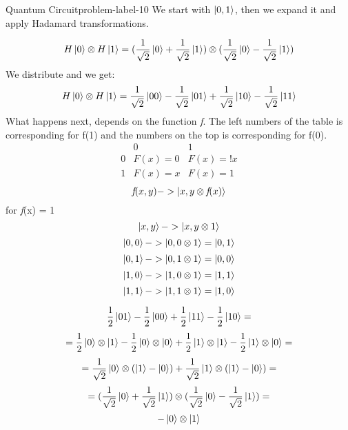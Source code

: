 \begin{problem}{Quantum Circuit}{problem-label-10}
We start with $\ket{0,1}$, then we expand it and apply Hadamard transformations.

\[
H\ket{0} \otimes H\ket{1} = (\frac{1}{\sqrt{2}}\ket{0} + \frac{1}{\sqrt{2}}\ket{1}) \otimes (\frac{1}{\sqrt{2}}\ket{0}-\frac{1}{\sqrt{2}}\ket{1})
\]
We distribute and we get:
\[
H\ket{0} \otimes H\ket{1} = \frac{1}{\sqrt{2}}\ket{00}- \frac{1}{\sqrt{2}}\ket{01} + \frac{1}{\sqrt{2}}\ket{10}-\frac{1}{\sqrt{2}}\ket{11}
\]
What happens next, depends on the function \textit{f}. The left numbers of the table is corresponding for f(1) and the numbers on the top is corresponding for f(0).
\[
\begin{array}{c|c|c}
	 & 0 & 1 \\ \hline
	0 & F(x) = 0 & F(x) = !x \\
	1 & F(x) = x & F(x) = 1
\end{array}
\]
\[
\textit{f}(x,y) -> \ket{x,y\otimes \textit{f}(x)}
\]
for \textit{f}(x) = 1
\[
\ket{x,y} -> \ket{x,y\otimes1} 
\]
\[
\ket{0,0} -> \ket{0,0\otimes1} = \ket{0,1}
\]
\[
\ket{0,1} -> \ket{0,1\otimes1} = \ket{0,0}
\]
\[
\ket{1,0} -> \ket{1,0\otimes1} = \ket{1,1}
\]
\[
\ket{1,1} -> \ket{1,1\otimes1} = \ket{1,0}
\]

\[
\frac{1}{2} \ket{01} -\frac{1}{2}\ket{00}+\frac{1}{2}\ket{11}-\frac{1}{2}\ket{10}=
\]
\[
=\frac{1}{2} \ket{0}\otimes\ket{1} -\frac{1}{2}\ket{0}\otimes\ket{0}+
\frac{1}{2}\ket{1}\otimes\ket{1}-\frac{1}{2}\ket{1}\otimes\ket{0}=
\]
\[
=\frac{1}{\sqrt{2}}\ket{0}\otimes(\ket{1}-\ket{0})+\frac{1}{\sqrt{2}}\ket{1}\otimes(\ket{1}-\ket{0})=
\]
\[
=(\frac{1}{\sqrt{2}}\ket{0} + \frac{1}{\sqrt{2}}\ket{1}) \otimes (\frac{1}{\sqrt{2}}\ket{0}-\frac{1}{\sqrt{2}}\ket{1})=
\]
\[
-\ket{0} \otimes \ket{1}
\]

\end{problem}





\newpage
\vfill



